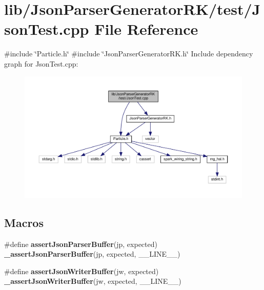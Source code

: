 \section{lib/\+Json\+Parser\+Generator\+R\+K/test/\+Json\+Test.cpp File Reference}
\label{_json_test_8cpp}
{\ttfamily \#include \char`\"{}Particle.\+h\char`\"{}}\newline
{\ttfamily \#include \char`\"{}Json\+Parser\+Generator\+R\+K.\+h\char`\"{}}\newline
Include dependency graph for Json\+Test.\+cpp\+:\nopagebreak
\begin{figure}[H]
\begin{center}
\leavevmode
\includegraphics[width=350pt]{_json_test_8cpp__incl}
\end{center}
\end{figure}
\subsection*{Macros}
\begin{DoxyCompactItemize}
\item 
\#define \textbf{ assert\+Json\+Parser\+Buffer}(jp,  expected)~\textbf{ \+\_\+assert\+Json\+Parser\+Buffer}(jp, expected, \+\_\+\+\_\+\+L\+I\+N\+E\+\_\+\+\_\+)
\item 
\#define \textbf{ assert\+Json\+Writer\+Buffer}(jw,  expected)~\textbf{ \+\_\+assert\+Json\+Writer\+Buffer}(jw, expected, \+\_\+\+\_\+\+L\+I\+N\+E\+\_\+\+\_\+)
\end{DoxyCompactItemize}
